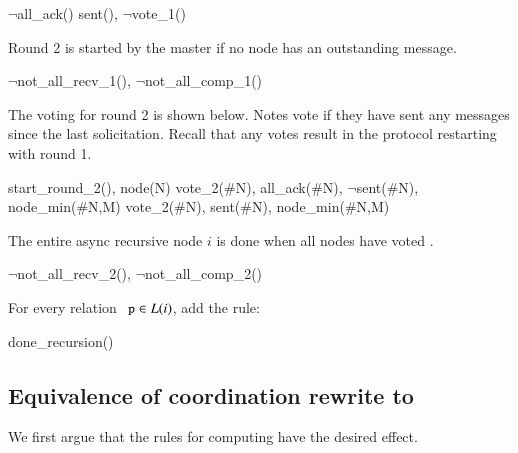 \begin{Drules}
      {$\lnot$all_ack()}
      {sent(), $\lnot$vote_1()}
\end{Drules}

Round 2 is started by the master if no node has an outstanding message.

\begin{Drules}
      {$\lnot$not_all_recv_1(), $\lnot$not_all_comp_1()}
\end{Drules}

The voting for round 2 is shown below.  Notes vote  if they have sent any messages since the last  solicitation.  Recall that any  votes result in the protocol restarting with round 1.

\begin{Drules}
      {start_round_2(), node(N)}
      {vote_2(#N), all_ack(#N), $\lnot$sent(#N), node_min(#N,M)}
      {vote_2(#N), sent(#N), node_min(#N,M)}
\end{Drules}

The entire async recursive node $i$ is done when all nodes have voted .

\begin{Drules}
      {$\lnot$not_all_recv_2(), $\lnot$not_all_comp_2()}
\end{Drules}

For every relation $\dedalus{p} \in L(i)$, add the rule:

\begin{Drules}
      {done_recursion()}
\end{Drules}

\subsection{Equivalence of coordination rewrite to \plang}
We first argue that the rules for computing  have the desired effect.


